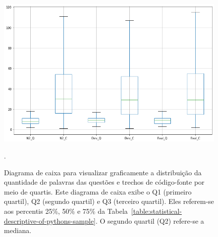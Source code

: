 \begin{figure}[h]
\centering
\includegraphics[width=1\textwidth]{figuras/cap-experimento/boxplot_number_of_words.png}
\caption{Diagrama de caixa para visualizar graficamente a distribuição da quantidade de palavras das questões e trechos de código-fonte por meio de quartis. Este diagrama de caixa exibe o Q1 (primeiro quartil), Q2 (segundo quartil) e Q3 (terceiro quartil). Eles referem-se aos percentis 25\%, 50\% e 75\% da Tabela~\ref{table:statistical-descriptive-of-pythons-sample}. O segundo quartil (Q2) refere-se a mediana. }. 
\label{fig:boxplot-number-of-words}
\end{figure}


